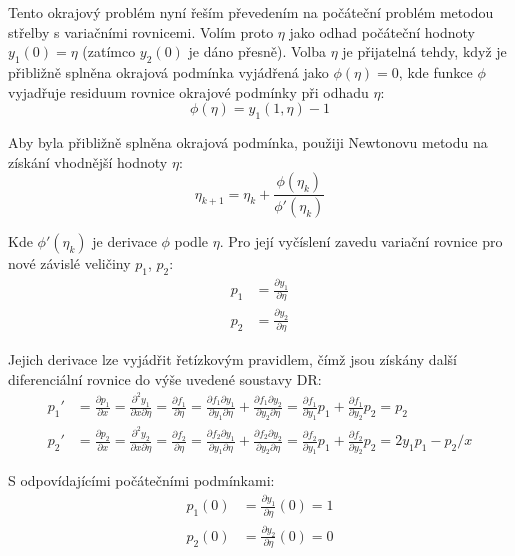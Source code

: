 \documentclass[a4paper,12pt]{article}
\begin{document}
Tento okrajový problém nyní řeším převedením na počáteční problém metodou střelby s variačními rovnicemi.
Volím proto $\eta$ jako odhad počáteční hodnoty $y_1(0) = \eta$ (zatímco $y_2(0)$ je dáno přesně).
Volba $\eta$ je přijatelná tehdy, když je přibližně splněna okrajová podmínka vyjádřená jako $\phi(\eta) = 0$, kde funkce $\phi$ vyjadřuje residuum rovnice okrajové podmínky při odhadu $\eta$:
\begin{equation}
	\phi(\eta) = y_1(1, \eta) - 1
\end{equation}

Aby byla přibližně splněna okrajová podmínka, použiji Newtonovu metodu na získání vhodnější hodnoty $\eta$:
\begin{equation}
	\eta_{k+1} = \eta_{k} + \frac{\phi(\eta_k)}{\phi'(\eta_k)}
\end{equation}

Kde $\phi'(\eta_k)$ je derivace $\phi$ podle $\eta$. Pro její vyčíslení zavedu variační rovnice pro nové závislé veličiny $p_1$, $p_2$:
\begin{align}
	p_1 &= \frac{\partial y_1}{\partial \eta}
	\\
	p_2 &= \frac{\partial y_2}{\partial \eta}
\end{align}

Jejich derivace lze vyjádřit řetízkovým pravidlem, čímž jsou získány další diferenciální rovnice do výše uvedené soustavy DR:
\begin{align}
	p_1' &=
	\frac{\partial p_1}{\partial x} =
	\frac{\partial^2 y_1}{\partial x \partial \eta} =
	\frac{\partial f_1}{\partial \eta} =
	\frac{\partial f_1 \partial y_1}{\partial y_1 \partial \eta} + \frac{\partial f_1 \partial y_2}{\partial y_2 \partial \eta} =
	\frac{\partial f_1}{\partial y_1} p_1 + \frac{\partial f_1}{\partial y_2} p_2 =
	p_2
	\\
	p_2' &=
	\frac{\partial p_2}{\partial x} =
	\frac{\partial^2 y_2}{\partial x \partial \eta} =
	\frac{\partial f_2}{\partial \eta} =
	\frac{\partial f_2 \partial y_1}{\partial y_1 \partial \eta} + \frac{\partial f_2 \partial y_2}{\partial y_2 \partial \eta} =
	\frac{\partial f_2}{\partial y_1} p_1 + \frac{\partial f_2}{\partial y_2} p_2 =
	2 y_1 p_1 - p_2 / x
\end{align}

S odpovídajícími počátečními podmínkami:
\begin{align}
	p_1(0) &= \frac{\partial y_1}{\partial \eta}(0) = 1
	\\
	p_2(0) &= \frac{\partial y_2}{\partial \eta}(0) = 0
\end{align}
\end{document}
